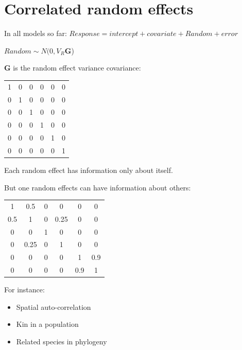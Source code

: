 \documentclass{beamer}
\begin{document}
\section{Correlated random effects}

\begin{frame}{In all models so far:}
$Response = intercept + covariate + Random + error$

$Random \sim N(0, V_{R} \mathbf{G} $)

$\mathbf{G}$ is the random effect variance covariance:
 
 \begin{center}
 \begin{tabular}[t]{cccccc}
1 & 0 & 0 & 0 & 0 & 0\\
0 & 1 & 0 & 0 & 0 & 0\\
0 & 0 & 1 & 0 & 0 & 0\\
0 & 0 & 0 & 1 & 0 & 0\\
0 & 0 & 0 & 0 & 1 & 0\\
0 & 0 & 0 & 0 & 0 & 1
 \end{tabular}
 \end{center}

 Each random effect has information only about itself.
 
\end{frame}

\begin{frame}{But one random effects can have information about others:}

\begin{center}
 \begin{tabular}[t]{cccccc}
1 & 0.5 & 0 & 0 & 0 & 0\\
0.5 & 1 & 0 & 0.25 & 0 & 0\\
0 & 0 & 1 & 0 & 0 & 0\\
0 & 0.25 & 0 & 1 & 0 & 0\\
0 & 0 & 0 & 0 & 1 & 0.9\\
0 & 0 & 0 & 0 & 0.9 & 1
 \end{tabular}
 \end{center}

 \begin{exampleblock}{For instance:}
    \begin{itemize}
     \item Spatial auto-correlation
     \item Kin in a population
     \item Related species in phylogeny
    \end{itemize}
 \end{exampleblock}

\end{frame}
\end{document}
